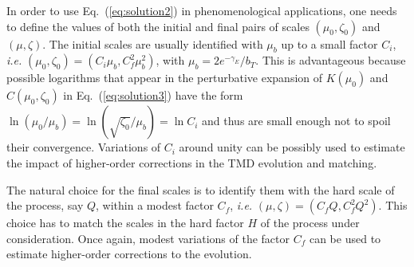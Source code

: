 \documentclass[10pt,a4paper]{article}
\begin{document}
In order to use Eq.~(\ref{eq:solution2}) in phenomenological
applications, one needs to define the values of both the initial and
final pairs of scales $(\mu_0,\zeta_0)$ and $(\mu,\zeta)$. The initial
scales are usually identified with $\mu_b$ up to a small factor $C_i$,
\textit{i.e.}  $(\mu_0,\zeta_0) = (C_i\mu_b,C_f^2\mu_b^2)$, with
$\mu_b = 2e^{-\gamma_E}/b_T$. This is advantageous because possible
logarithms that appear in the perturbative expansion of $K(\mu_0)$ and
$C(\mu_0,\zeta_0)$ in Eq.~(\ref{eq:solution3}) have the form
$\ln(\mu_0/\mu_b)=\ln(\sqrt{\zeta_0}/\mu_b)=\ln C_i$ and thus are
small enough not to spoil their convergence. Variations of $C_i$
around unity can be possibly used to estimate the impact of
higher-order corrections in the TMD evolution and matching.

The natural choice for the final scales is to identify them with the
hard scale of the process, say $Q$, within a modest factor $C_f$,
\textit{i.e.}  $(\mu,\zeta) = (C_fQ,C_f^2Q^2)$. This choice has to
match the scales in the hard factor $H$ of the process under
consideration. Once again, modest variations of the factor $C_f$ can
be used to estimate higher-order corrections to the evolution.


\end{document}
